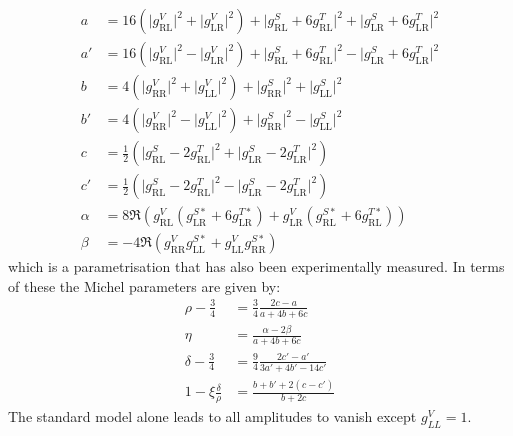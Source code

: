 \begin{align*}
a&= 16( \lvert g_\text{RL}^V \lvert ^2 + \lvert g_\text{LR}^V \lvert ^2)+ \lvert g_\text{RL}^S + 6g_\text{RL}^T \lvert ^2+ \lvert g_\text{LR}^S + 6g_\text{LR}^T \lvert ^2  \\
a'&=16( \lvert g_\text{RL}^V \lvert ^2 - \lvert g_\text{LR}^V \lvert ^2)+ \lvert g_\text{RL}^S + 6g_\text{RL}^T \lvert ^2- \lvert g_\text{LR}^S + 6g_\text{LR}^T \lvert ^2 \\
b&=4(\lvert g_\text{RR}^V \lvert^2+\lvert g_\text{LL}^V \lvert ^2)+\lvert g_\text{RR}^S \lvert ^2+\lvert g_\text{LL}^S \lvert ^2\\
b'&=4(\lvert g_\text{RR}^V \lvert^2-\lvert g_\text{LL}^V \lvert ^2)+\lvert g_\text{RR}^S \lvert ^2-\lvert g_\text{LL}^S \lvert ^2\\
c&=\frac{1}{2}(\lvert g_\text{RL}^S -2g_\text{RL}^T \lvert ^2+\lvert g_\text{LR}^S -2g_\text{LR}^T \lvert ^2)\\
c'&=\frac{1}{2}(\lvert g_\text{RL}^S -2g_\text{RL}^T \lvert ^2-\lvert g_\text{LR}^S -2g_\text{LR}^T \lvert ^2)\\
\alpha &= 8\Re (g_\text{RL}^V(g_\text{LR}^{S*}+6g_\text{LR}^{T*})+g_\text{LR}^V(g_\text{RL}^{S*}+6g_\text{RL}^{T*}))\\
\beta &=-4\Re (g_\text{RR}^V g_\text{LL}^{S*}+g_\text{LL}^V g_\text{RR}^{S*})
\end{align*}
which is a parametrisation that has also been experimentally measured. In terms of these the Michel parameters are given by:
\begin{align}
\rho -\frac{3}{4}&= \frac{3}{4}\frac{2c -a }{a+4b+6c}\\
\eta &=\frac{\alpha -2\beta}{a+4b+6c}\\
\delta -\frac{3}{4}&=\frac{9}{4}\frac{2c'-a'}{3a'+4b'-14c'}\\
1-\xi\frac{\delta}{\rho}&=\frac{b+b'+2(c-c')}{b+2c}
\end{align}
The standard model alone leads to all amplitudes to vanish except $g_{LL}^V =1$.
 
